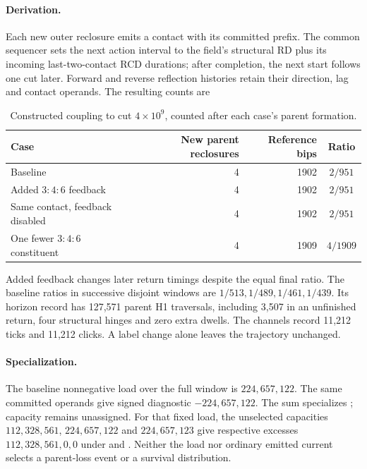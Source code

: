 \paragraph{Derivation.}
Each new outer reclosure emits a contact with its committed prefix. The common
sequencer sets the next action interval to the field's structural RD plus its
incoming last-two-contact RCD durations; after completion, the next start follows
one cut later. Forward and reverse reflection histories
retain their direction, lag and contact operands. The resulting counts are
\begin{table}[H]
\centering\small
\caption{Constructed coupling to cut \(4\times10^9\), counted after each
case's parent formation.}
\label{tab:manual2-constructed-cadence}
\begin{tabular}{@{}lrrc@{}}
\toprule
Case & New parent reclosures & Reference bips & Ratio\\
\midrule
Baseline & 4 & 1902 & \(2/951\)\\
Added \(3{:}4{:}6\) feedback & 4 & 1902 & \(2/951\)\\
Same contact, feedback disabled & 4 & 1902 & \(2/951\)\\
One fewer \(3{:}4{:}6\) constituent & 4 & 1909 & \(4/1909\)\\
\bottomrule
\end{tabular}
\end{table}
Added feedback changes later return timings despite the equal final ratio.
The baseline ratios in successive disjoint windows are
\(1/513,1/489,1/461,1/439\). Its horizon record has 127,571 parent H1
traversals, including 3,507 in an unfinished return, four structural hinges and
zero extra dwells. The channels record 11,212 ticks and 11,212 clicks.
A label change alone leaves the trajectory unchanged.

\paragraph{Specialization.}
The baseline nonnegative load over the full window is \(224{,}657{,}122\).
The same committed operands give signed diagnostic \(-224{,}657{,}122\).
The sum specializes ; capacity remains
unassigned.
For that fixed load, the unselected capacities \(112{,}328{,}561\),
\(224{,}657{,}122\) and \(224{,}657{,}123\) give respective excesses
\(112{,}328{,}561,0,0\) under  and
. Neither the load nor ordinary emitted current
selects a parent-loss event or a survival distribution.

